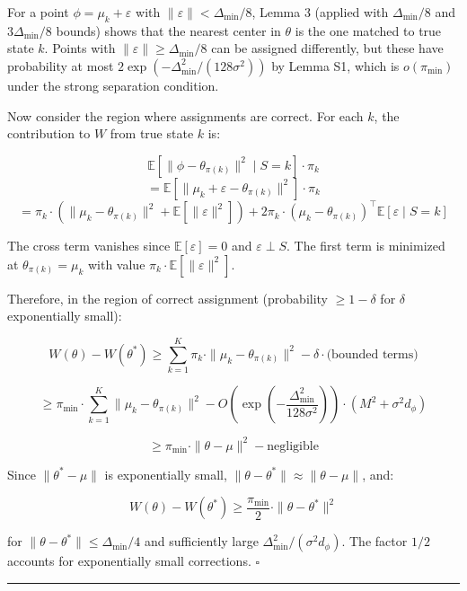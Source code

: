 \documentclass[
  12pt,
]{ctexart}
\begin{document}
For a point \(\phi = \mu_k + \varepsilon\) with
\(\|\varepsilon\| < \Delta_{\min}/8\), Lemma 3 (applied with
\(\Delta_{\min}/8\) and \(3\Delta_{\min}/8\) bounds) shows that the
nearest center in \(\theta\) is the one matched to true state \(k\).
Points with \(\|\varepsilon\| \geq \Delta_{\min}/8\) can be assigned
differently, but these have probability at most
\(2\exp(-\Delta_{\min}^2/(128\sigma^2))\) by Lemma S1, which is
\(o(\pi_{\min})\) under the strong separation condition.

Now consider the region where assignments are correct. For each \(k\),
the contribution to \(W\) from true state \(k\) is:

\[\mathbb{E}[\|\phi - \theta_{\pi(k)}\|^2 \mid S=k] \cdot \pi_k\]
\[= \mathbb{E}[\|\mu_k + \varepsilon - \theta_{\pi(k)}\|^2] \cdot \pi_k\]
\[= \pi_k \cdot \left( \|\mu_k - \theta_{\pi(k)}\|^2 + \mathbb{E}[\|\varepsilon\|^2] \right) + 2\pi_k \cdot (\mu_k - \theta_{\pi(k)})^\top \mathbb{E}[\varepsilon \mid S=k]\]

The cross term vanishes since \(\mathbb{E}[\varepsilon] = 0\) and
\(\varepsilon \perp S\). The first term is minimized at
\(\theta_{\pi(k)} = \mu_k\) with value
\(\pi_k \cdot \mathbb{E}[\|\varepsilon\|^2]\).

Therefore, in the region of correct assignment (probability
\(\geq 1 - \delta\) for \(\delta\) exponentially small):

\[W(\theta) - W(\theta^*) \geq \sum_{k=1}^K \pi_k \cdot \|\mu_k - \theta_{\pi(k)}\|^2 - \delta \cdot \text{(bounded terms)}\]

\[\geq \pi_{\min} \cdot \sum_{k=1}^K \|\mu_k - \theta_{\pi(k)}\|^2 - O\left(\exp(-\frac{\Delta_{\min}^2}{128\sigma^2})\right) \cdot (M^2 + \sigma^2 d_\phi)\]

\[\geq \pi_{\min} \cdot \|\theta - \mu\|^2 - \text{negligible}\]

Since \(\|\theta^* - \mu\|\) is exponentially small,
\(\|\theta - \theta^*\| \approx \|\theta - \mu\|\), and:

\[W(\theta) - W(\theta^*) \geq \frac{\pi_{\min}}{2} \cdot \|\theta - \theta^*\|^2\]

for \(\|\theta - \theta^*\| \leq \Delta_{\min}/4\) and sufficiently
large \(\Delta_{\min}^2/(\sigma^2 d_\phi)\). The factor \(1/2\) accounts
for exponentially small corrections. \(\square\)

\begin{center}\rule{0.5\linewidth}{0.5pt}\end{center}
\end{document}
